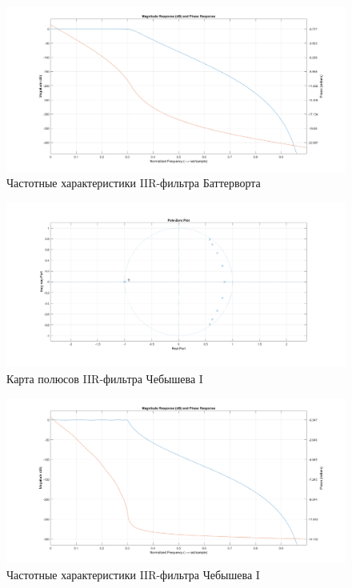 \documentclass[12pt,a4paper]{article}
\begin{document}
	\begin{figure}[H]
		\centering
		\includegraphics[width=1.0\linewidth]{res/5_2_batt_ach.png}
		\caption{Частотные характеристики IIR-фильтра Баттерворта}
	\end{figure}

	
	\begin{figure}[H]
		\centering
		\includegraphics[width=1.0\linewidth]{res/5_2_cheb1_poles.png}
		\caption{Карта полюсов IIR-фильтра Чебышева I}
	\end{figure}
	
	\begin{figure}[H]
		\centering
		\includegraphics[width=1.0\linewidth]{res/5_2_cheb1_ach.png}
		\caption{Частотные характеристики IIR-фильтра Чебышева I}
	\end{figure}
\end{document}
